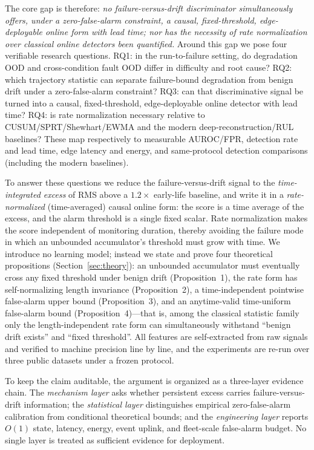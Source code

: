 \documentclass[journal]{IEEEtran}
\begin{document}
The core gap is therefore: \emph{no failure-versus-drift discriminator simultaneously offers, under a zero-false-alarm constraint, a causal, fixed-threshold, edge-deployable online form with lead time; nor has the necessity of rate normalization over classical online detectors been quantified.} Around this gap we pose four verifiable research questions. RQ1: in the run-to-failure setting, do degradation OOD and cross-condition fault OOD differ in difficulty and root cause? RQ2: which trajectory statistic can separate failure-bound degradation from benign drift under a zero-false-alarm constraint? RQ3: can that discriminative signal be turned into a causal, fixed-threshold, edge-deployable online detector with lead time? RQ4: is rate normalization necessary relative to CUSUM/SPRT/Shewhart/EWMA and the modern deep-reconstruction/RUL baselines? These map respectively to measurable AUROC/FPR, detection rate and lead time, edge latency and energy, and same-protocol detection comparisons (including the modern baselines).

To answer these questions we reduce the failure-versus-drift signal to the \emph{time-integrated excess} of RMS above a $1.2\times$ early-life baseline, and write it in a \emph{rate-normalized} (time-averaged) causal online form: the score is a time average of the excess, and the alarm threshold is a single fixed scalar. Rate normalization makes the score independent of monitoring duration, thereby avoiding the failure mode in which an unbounded accumulator's threshold must grow with time. We introduce no learning model; instead we state and prove four theoretical propositions (Section~\ref{sec:theory}): an unbounded accumulator must eventually cross any fixed threshold under benign drift (Proposition~1), the rate form has self-normalizing length invariance (Proposition~2), a time-independent pointwise false-alarm upper bound (Proposition~3), and an anytime-valid time-uniform false-alarm bound (Proposition~4)---that is, among the classical statistic family only the length-independent rate form can simultaneously withstand ``benign drift exists'' and ``fixed threshold''. All features are self-extracted from raw signals and verified to machine precision line by line, and the experiments are re-run over three public datasets under a frozen protocol.

To keep the claim auditable, the argument is organized as a three-layer evidence chain. The \emph{mechanism layer} asks whether persistent excess carries failure-versus-drift information; the \emph{statistical layer} distinguishes empirical zero-false-alarm calibration from conditional theoretical bounds; and the \emph{engineering layer} reports $O(1)$ state, latency, energy, event uplink, and fleet-scale false-alarm budget. No single layer is treated as sufficient evidence for deployment.
\end{document}

